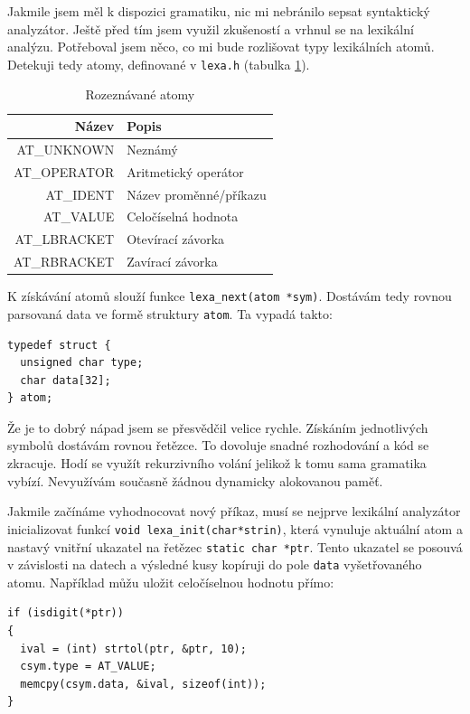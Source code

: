\documentclass[a4paper, 12pt]{article}
\begin{document}
Jakmile jsem měl k dispozici gramatiku, nic mi nebránilo sepsat
syntaktický analyzátor. Ještě před tím jsem využil zkušeností a vrhnul
se na lexikální analýzu.  Potřeboval jsem něco, co mi bude rozlišovat
typy lexikálních atomů. Detekuji tedy atomy, definované v
\texttt{lexa.h} (tabulka \ref{tab:atom}).

\begin{table}
\centering
\begin{tabular}{|r|l|}
\hline
Název & Popis\\ \hline\hline
AT\_UNKNOWN & Neznámý\\ \hline
AT\_OPERATOR & Aritmetický operátor\\ \hline
AT\_IDENT & Název proměnné/příkazu\\ \hline
AT\_VALUE & Celočíselná hodnota\\ \hline
AT\_LBRACKET & Otevírací závorka\\ \hline
AT\_RBRACKET & Zavírací závorka\\
\hline
\end{tabular}
\caption{Rozeznávané atomy}
\label{tab:atom}
\end{table}

K získávání atomů slouží funkce \verb+lexa_next(atom *sym)+.  Dostávám
tedy rovnou parsovaná data ve formě struktury \texttt{atom}.  Ta
vypadá takto:
\begin{lstlisting}
typedef struct {
  unsigned char type;
  char data[32];
} atom;
\end{lstlisting}

Že je to dobrý nápad jsem se přesvědčil velice rychle. Získáním
jednotlivých symbolů dostávám rovnou řetězce. To dovoluje snadné
rozhodování a kód se zkracuje. Hodí se využít rekurzivního
volání jelikož k tomu sama gramatika vybízí.
Nevyužívám současně žádnou dynamicky alokovanou paměť.

Jakmile začínáme vyhodnocovat nový příkaz, musí se nejprve lexikální
analyzátor inicializovat funkcí
\verb+void lexa_init(char*strin)+, která vynuluje aktuální atom a
nastavý vnitřní ukazatel na řetězec \texttt{static char *ptr}. Tento
ukazatel se posouvá v závislosti na datech a výsledné kusy kopíruji do pole
\texttt{data} vyšetřovaného atomu. Například můžu uložit celočíselnou
hodnotu přímo:

\begin{lstlisting}
if (isdigit(*ptr))
{
  ival = (int) strtol(ptr, &ptr, 10);
  csym.type = AT_VALUE;
  memcpy(csym.data, &ival, sizeof(int));
}
\end{lstlisting}
\end{document}
